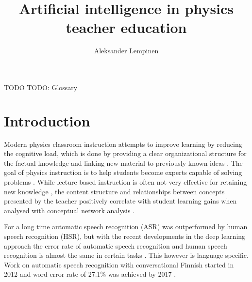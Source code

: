 \documentclass[utf8,english]{gradu3}
\begin{document}
\title{Artificial intelligence in physics teacher education}

\author{Aleksander Lempinen}



\maketitle

\begin{thetermlist}
\item[TODO] TODO: Glossary
\end{thetermlist}

\mainmatter

\chapter{Introduction}
Modern physics classroom instruction attempts to improve learning by reducing the cognitive load, which is done by providing a clear organizational structure for the factual knowledge and linking new material to previously known ideas \parencite{wieman2005transforming}. The goal of physics instruction is to help students become experts capable of solving problems \parencite{fischer2014quality,wieman2005transforming}. While lecture based instruction is often not very effective for retaining new knowledge \parencite{wieman2005transforming}, the content structure and relationships between concepts presented by the teacher positively correlate with student learning gains when analysed with conceptual network analysis \parencite{fischer2014quality}. 

For a long time automatic speech recognition (ASR) was outperformed by human speech recognition (HSR), but with the recent developments in the deep learning approach the error rate of automatic speech recognition and human speech recognition is almost the same in certain tasks \parencite{spille2018comparing}. This however is language specific. Work on automatic speech recognition with conversational Finnish started in 2012 and word error rate of 27.1\% was achieved by 2017 \parencite{enarvi2018modeling}. 
\end{document}
